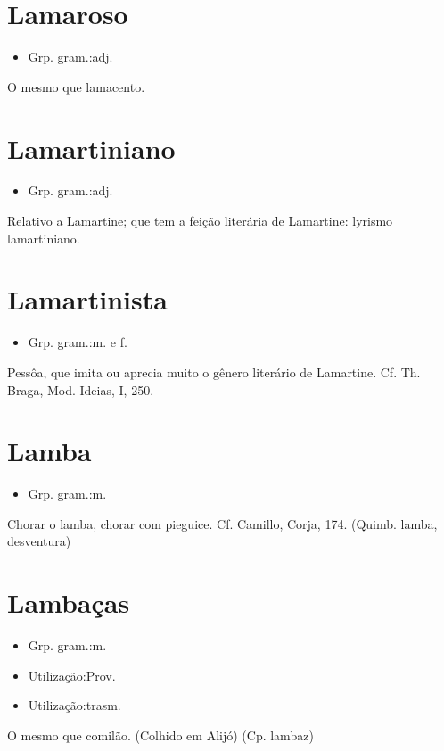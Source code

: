 \section{Lamaroso}
\begin{itemize}
\item {Grp. gram.:adj.}
\end{itemize}
O mesmo que \textunderscore lamacento\textunderscore .
\section{Lamartiniano}
\begin{itemize}
\item {Grp. gram.:adj.}
\end{itemize}
Relativo a Lamartine; que tem a feição literária de Lamartine: \textunderscore lyrismo lamartiniano\textunderscore .
\section{Lamartinista}
\begin{itemize}
\item {Grp. gram.:m.  e  f.}
\end{itemize}
Pessôa, que imita ou aprecia muito o gênero literário de Lamartine. Cf. Th. Braga, \textunderscore Mod. Ideias\textunderscore , I, 250.
\section{Lamba}
\begin{itemize}
\item {Grp. gram.:m.}
\end{itemize}
\textunderscore Chorar o lamba\textunderscore , chorar com pieguice. Cf. Camillo, \textunderscore Corja\textunderscore , 174.
(Quimb. \textunderscore lamba\textunderscore , desventura)
\section{Lambaças}
\begin{itemize}
\item {Grp. gram.:m.}
\end{itemize}
\begin{itemize}
\item {Utilização:Prov.}
\end{itemize}
\begin{itemize}
\item {Utilização:trasm.}
\end{itemize}
O mesmo que \textunderscore comilão\textunderscore . (Colhido em Alijó)
(Cp. \textunderscore lambaz\textunderscore )

